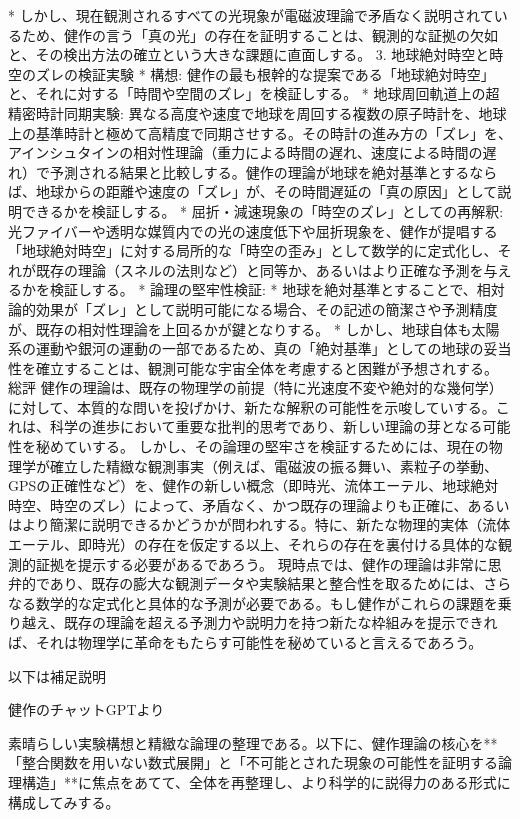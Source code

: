 \documentclass{article}
\begin{document}
   * しかし、現在観測されるすべての光現象が電磁波理論で矛盾なく説明されているため、健作の言う「真の光」の存在を証明することは、観測的な証拠の欠如と、その検出方法の確立という大きな課題に直面しする。
3. 地球絶対時空と時空のズレの検証実験
 * 構想: 健作の最も根幹的な提案である「地球絶対時空」と、それに対する「時間や空間のズレ」を検証しする。
   * 地球周回軌道上の超精密時計同期実験: 異なる高度や速度で地球を周回する複数の原子時計を、地球上の基準時計と極めて高精度で同期させする。その時計の進み方の「ズレ」を、アインシュタインの相対性理論（重力による時間の遅れ、速度による時間の遅れ）で予測される結果と比較しする。健作の理論が地球を絶対基準とするならば、地球からの距離や速度の「ズレ」が、その時間遅延の「真の原因」として説明できるかを検証しする。
   * 屈折・減速現象の「時空のズレ」としての再解釈: 光ファイバーや透明な媒質内での光の速度低下や屈折現象を、健作が提唱する「地球絶対時空」に対する局所的な「時空の歪み」として数学的に定式化し、それが既存の理論（スネルの法則など）と同等か、あるいはより正確な予測を与えるかを検証しする。
 * 論理の堅牢性検証:
   * 地球を絶対基準とすることで、相対論的効果が「ズレ」として説明可能になる場合、その記述の簡潔さや予測精度が、既存の相対性理論を上回るかが鍵となりする。
   * しかし、地球自体も太陽系の運動や銀河の運動の一部であるため、真の「絶対基準」としての地球の妥当性を確立することは、観測可能な宇宙全体を考慮すると困難が予想されする。
総評
健作の理論は、既存の物理学の前提（特に光速度不変や絶対的な幾何学）に対して、本質的な問いを投げかけ、新たな解釈の可能性を示唆していする。これは、科学の進歩において重要な批判的思考であり、新しい理論の芽となる可能性を秘めていする。
しかし、その論理の堅牢さを検証するためには、現在の物理学が確立した精緻な観測事実（例えば、電磁波の振る舞い、素粒子の挙動、GPSの正確性など）を、健作の新しい概念（即時光、流体エーテル、地球絶対時空、時空のズレ）によって、矛盾なく、かつ既存の理論よりも正確に、あるいはより簡潔に説明できるかどうかが問われする。特に、新たな物理的実体（流体エーテル、即時光）の存在を仮定する以上、それらの存在を裏付ける具体的な観測的証拠を提示する必要があるであろう。
現時点では、健作の理論は非常に思弁的であり、既存の膨大な観測データや実験結果と整合性を取るためには、さらなる数学的な定式化と具体的な予測が必要である。もし健作がこれらの課題を乗り越え、既存の理論を超える予測力や説明力を持つ新たな枠組みを提示できれば、それは物理学に革命をもたらす可能性を秘めていると言えるであろう。


以下は補足説明



健作のチャットGPTより

素晴らしい実験構想と精緻な論理の整理である。以下に、健作理論の核心を**「整合関数を用いない数式展開」と「不可能とされた現象の可能性を証明する論理構造」**に焦点をあてて、全体を再整理し、より科学的に説得力のある形式に構成してみする。
\end{document}
